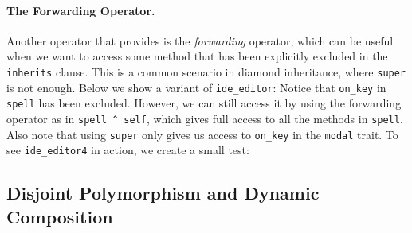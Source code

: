 \paragraph{The Forwarding Operator.}
Another operator that \sedel provides is the \emph{forwarding} operator, which can be useful when we want to access some method that has been
explicitly excluded in the \lstinline{inherits} clause. This is a common scenario in
diamond inheritance, where \lstinline{super} is not enough. Below we show a
variant of \lstinline{ide_editor}:
Notice that \lstinline{on_key} in \lstinline{spell} has been
excluded. However, we can
still access it by using the forwarding operator as in \lstinline{spell ^ self},
which gives full access to all the methods in \lstinline{spell}. Also note that
using \lstinline{super} only gives us access to \lstinline{on_key} in the
\lstinline{modal} trait. To see \lstinline{ide_editor4} in action, we create a
small test:




\subsection{Disjoint Polymorphism and Dynamic Composition}
\label{sec:merge}

